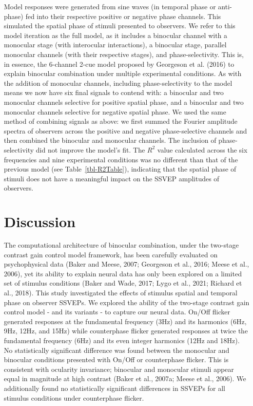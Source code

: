 \documentclass[review,
  12pt,
]{elsarticle}
\begin{document}
Model responses were generated from sine waves (in temporal phase or
anti-phase) fed into their respective positive or negative phase
channels. This simulated the spatial phase of stimuli presented to
observers. We refer to this model iteration as the full model, as it
includes a binocular channel with a monocular stage (with interocular
interactions), a binocular stage, parallel monocular channels (with
their respective stages), and phase-selectivity. This is, in essence,
the 6-channel 2-cue model proposed by Georgeson et al. (2016) to explain
binocular combination under multiple experimental conditions. As with
the addition of monocular channels, including phase-selectivity to the
model means we now have six final signals to contend with: a binocular
and two monocular channels selective for positive spatial phase, and a
binocular and two monocular channels selective for negative spatial
phase. We used the same method of combining signals as above: we first
summed the Fourier amplitude spectra of observers across the positive
and negative phase-selective channels and then combined the binocular
and monocular channels. The inclusion of phase-selectivity did not
improve the model's fit. The \(R^2\) value calculated across the six
frequencies and nine experimental conditions was no different than that
of the previous model (see Table~\ref{tbl-R2Table}), indicating that the
spatial phase of stimuli does not have a meaningful impact on the SSVEP
amplitudes of observers.

\section{Discussion}\label{discussion}

The computational architecture of binocular combination, under the
two-stage contrast gain control model framework, has been carefully
evaluated on psychophysical data (Baker and Meese, 2007; Georgeson et
al., 2016; Meese et al., 2006), yet its ability to explain neural data
has only been explored on a limited set of stimulus conditions (Baker
and Wade, 2017; Lygo et al., 2021; Richard et al., 2018). This study
investigated the effects of stimulus spatial and temporal phase on
observer SSVEPs. We explored the ability of the two-stage contrast gain
control model - and its variants - to capture our neural data. On/Off
flicker generated responses at the fundamental frequency (3Hz) and its
harmonics (6Hz, 9Hz, 12Hz, and 15Hz) while counterphase flicker
generated responses at twice the fundamental frequency (6Hz) and its
even integer harmonics (12Hz and 18Hz). No statistically significant
difference was found between the monocular and binocular conditions
presented with On/Off or counterphase flicker. This is consistent with
ocularity invariance; binocular and monocular stimuli appear equal in
magnitude at high contrast (Baker et al., 2007a; Meese et al., 2006). We
additionally found no statistically significant differences in SSVEPs
for all stimulus conditions under counterphase flicker.
\end{document}
